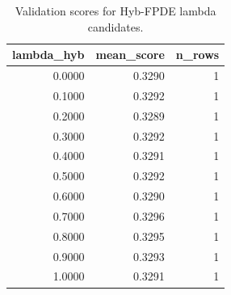 \begin{table}[t]
\caption{Validation scores for Hyb-FPDE lambda candidates.}
\label{tab:lambda_distribution_computed}
\centering
\begin{tabular}{rrr}
\toprule
lambda\_hyb & mean\_score & n\_rows \\
\midrule
0.0000 & 0.3290 & 1 \\
0.1000 & 0.3292 & 1 \\
0.2000 & 0.3289 & 1 \\
0.3000 & 0.3292 & 1 \\
0.4000 & 0.3291 & 1 \\
0.5000 & 0.3292 & 1 \\
0.6000 & 0.3290 & 1 \\
0.7000 & 0.3296 & 1 \\
0.8000 & 0.3295 & 1 \\
0.9000 & 0.3293 & 1 \\
1.0000 & 0.3291 & 1 \\
\bottomrule
\end{tabular}

\end{table}
